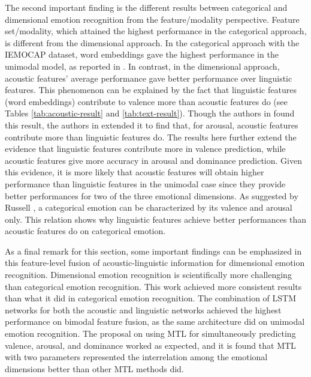 The second important finding is the different results between categorical and
dimensional emotion recognition from the feature/modality perspective. Feature
set/modality, which attained the highest performance in the categorical
approach, is different from the dimensional approach. In the categorical
approach with the IEMOCAP dataset, word embeddings gave the highest performance
in the unimodal model, as reported in \cite{Atmaja2019b, Tripathi2018,
Yoon2019, Sahu2019}. In contrast, in the dimensional approach, acoustic
features' average performance gave better performance over linguistic features.
This phenomenon can be explained by the fact that linguistic features (word
embeddings) contribute to valence more than acoustic features do (see Tables
\ref{tab:acoustic-result} and \ref{tab:text-result}). Though the authors in
\cite{Aldeneh2017} found this result, the authors in \cite{chen2017multimodal,
Eyben2010, Karadogan2012} extended it to find that, for arousal, acoustic
features contribute more than linguistic features do. The results here further
extend the evidence that linguistic features contribute more in valence
prediction, while acoustic features give more accuracy in arousal and dominance
prediction.  Given this evidence, it is more likely that acoustic features will
obtain higher performance than linguistic features in the unimodal case since
they provide better performances for two of the three emotional dimensions. As
suggested by Russell \cite{Russell1980}, a categorical emotion can be
characterized by its valence and arousal only. This relation shows why
linguistic features achieve better performances than acoustic features do on
categorical emotion.

As a final remark for this section, some important findings can be emphasized
in this feature-level fusion of acoustic-linguistic information for dimensional
emotion recognition. Dimensional emotion recognition is scientifically more
challenging than categorical emotion recognition. This work achieved more
consistent results than what it did in categorical emotion recognition. The
combination of LSTM networks for both the acoustic and linguistic networks
achieved the highest performance on bimodal feature fusion, as the same
architecture did on unimodal emotion recognition.  The proposal on using MTL
for simultaneously predicting valence, arousal, and dominance worked as
expected, and it is found that MTL with two parameters represented the
interrelation among the emotional dimensions better than other MTL methods did.

